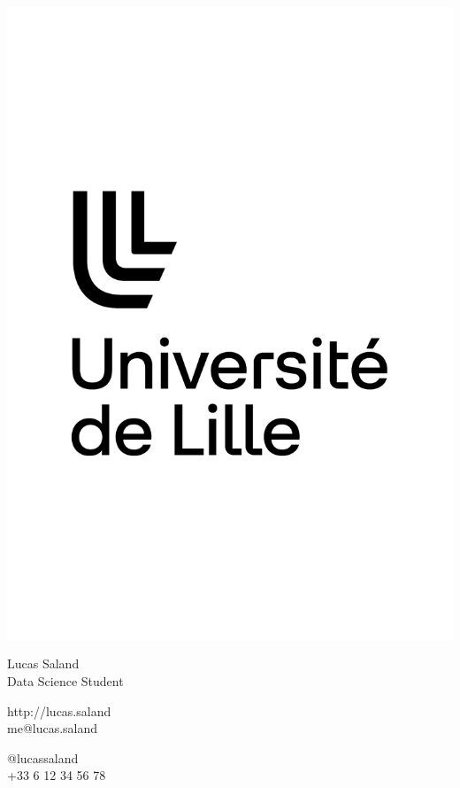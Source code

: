 \documentclass{article}
\begin{document}
\centering \includegraphics[width=.25\linewidth]{logo}\\[5pt]
\parbox{2in}{\Large \centering Lucas Saland\\[1pt]
\normalsize Data Science Student}

\vfill
\raggedright
\begin{multicols}{2}
http://lucas.saland\\
me@lucas.saland

\columnbreak
\raggedleft
@lucassaland\\
+33 6 12 34 56 78%
\end{multicols}%
\end{document}
